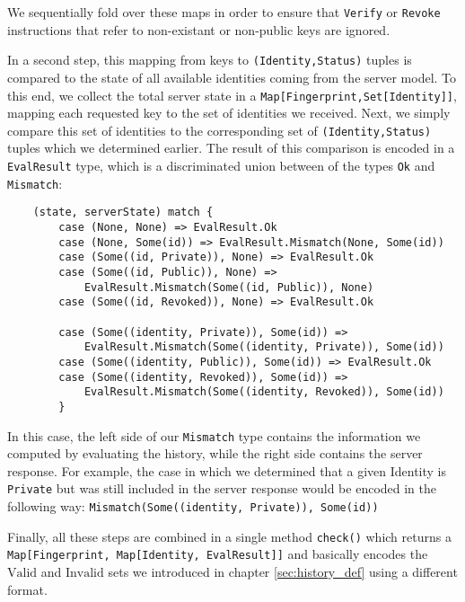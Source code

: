 We sequentially fold over these maps in order to ensure that \texttt{Verify} or \texttt{Revoke} instructions that refer to non-existant or non-public keys are ignored.


In a second step, this mapping from keys to \texttt{(Identity,Status)} tuples is compared to the state of all available identities coming from the server model.
To this end, we collect the total server state in a \texttt{Map[Fingerprint,Set[Identity]]}, mapping each requested key to the set of identities we received. 
Next, we simply compare this set of identities to the corresponding set of \texttt{(Identity,Status)} tuples which we determined earlier. The result of this comparison is encoded in a \texttt{EvalResult} type, which is a discriminated union between of the types \texttt{Ok} and \texttt{Mismatch}: 
\begin{code}
    \begin{verbatim}
    (state, serverState) match {
        case (None, None) => EvalResult.Ok
        case (None, Some(id)) => EvalResult.Mismatch(None, Some(id))
        case (Some((id, Private)), None) => EvalResult.Ok
        case (Some((id, Public)), None) =>
            EvalResult.Mismatch(Some((id, Public)), None)
        case (Some((id, Revoked)), None) => EvalResult.Ok

        case (Some((identity, Private)), Some(id)) =>
            EvalResult.Mismatch(Some((identity, Private)), Some(id))
        case (Some((identity, Public)), Some(id)) => EvalResult.Ok
        case (Some((identity, Revoked)), Some(id)) =>
            EvalResult.Mismatch(Some((identity, Revoked)), Some(id))
        }
    \end{verbatim}
    \caption{Comparison between a computed state and a server state}
\end{code}

In this case, the left side of our \texttt{Mismatch} type contains the information we computed by evaluating the history, while the right side contains the server response. For example, the case in which we determined that a given Identity is \texttt{Private} but was still included in the server response would be encoded in the following way: \texttt{Mismatch(Some((identity, Private)), Some(id))}

Finally, all these steps are combined in a single method \texttt{check()} which returns a \texttt{Map[Fingerprint, Map[Identity, EvalResult]]} and basically encodes the \(\text{Valid}\) and \(\text{Invalid}\) sets we introduced in chapter \ref{sec:history_def} using a different format. 


